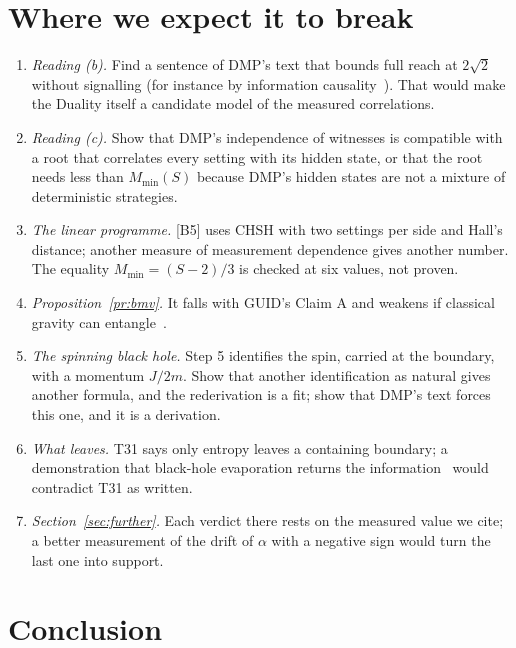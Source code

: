 \documentclass[11pt,a4paper]{article}
\theoremstyle{definition}
\theoremstyle{remark}
\newcommand{\chk}[1]{\textsf{[#1]}}
\begin{document}
\section{Where we expect it to break}\label{sec:break}
\begin{enumerate}[nosep]
\item \emph{Reading (b).} Find a sentence of DMP's text that bounds full reach at $2\sqrt2$ without signalling (for instance by
information causality~\cite{ic}). That would make the Duality itself a candidate model of the measured correlations.
\item \emph{Reading (c).} Show that DMP's independence of witnesses is compatible with a root that correlates every setting with its
hidden state, or that the root needs less than $M_{\min}(S)$ because DMP's hidden states are not a mixture of deterministic strategies.
\item \emph{The linear programme.} \chk{B5} uses CHSH with two settings per side and Hall's distance; another measure of measurement
dependence gives another number. The equality $M_{\min}=(S-2)/3$ is checked at six values, not proven.
\item \emph{Proposition~\ref{pr:bmv}.} It falls with GUID's Claim A and weakens if classical gravity can entangle~\cite{azizhowl}.
\item \emph{The spinning black hole.} Step 5 identifies the spin, carried at the boundary, with a momentum $J/2m$. Show that another
identification as natural gives another formula, and the rederivation is a fit; show that DMP's text forces this one, and it is a
derivation.
\item \emph{What leaves.} T31 says only entropy leaves a containing boundary; a demonstration that black-hole evaporation returns the
information~\cite{page} would contradict T31 as written.
\item \emph{Section~\ref{sec:further}.} Each verdict there rests on the measured value we cite; a better measurement of the drift of
$\alpha$ with a negative sign would turn the last one into support.
\end{enumerate}

\section{Conclusion}
\end{document}
